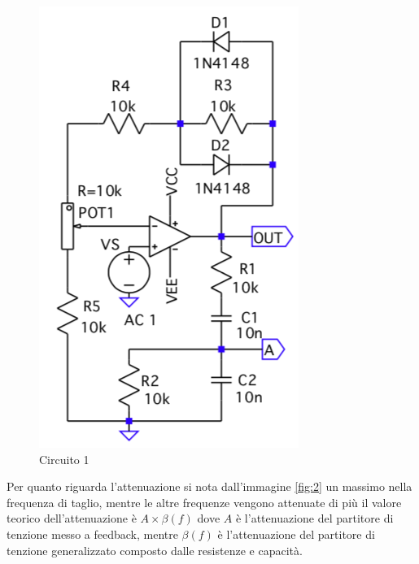\documentclass{article}
\begin{document}
	\begin{figure}
		\centering
		\includegraphics[width=\linewidth]{figure/circ1.png}
		\caption{Circuito 1}
		\label{fig:circ1}
	\end{figure}
	Per quanto riguarda l'attenuazione si nota dall'immagine \ref{fig:2} un massimo nella frequenza di taglio, mentre le altre frequenze vengono attenuate di più il valore teorico dell'attenuazione è $A\times \beta(f)$ dove $A$ è l'attenuazione del partitore di tenzione messo a feedback, mentre $\beta(f)$ è l'attenuazione del partitore di tenzione generalizzato composto dalle resistenze e capacità.\newline
\end{document}
